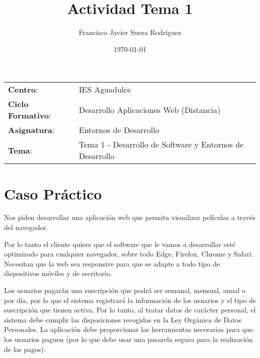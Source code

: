 


\title{
\normalfont \normalsize
\huge \textbf{Actividad Tema 1}
}
\author{Francisco Javier Sueza Rodríguez}
\date{\normalsize\today}



\maketitle

\vspace{2ex}

\begin{center}
    \begin{tabular}{l l}
        \textbf{Centro}: & IES Aguadulce \\
        \textbf{Ciclo Formativo}: & Desarrollo Aplicaciones Web (Distancia)\\
        \textbf{Asignatura}: & Entornos de Desarrollo\\
        \textbf{Tema}: & Tema 1 - Desarrollo de Software y Entornos de Desarrollo \\
    \end{tabular}
\end{center}

\vspace{10ex}

\section{Caso Práctico}
Nos piden desarrollar una aplicación web que permita visualizar películas a través del navegador.

Por lo tanto el cliente quiere que el software que le vamos a desarrollar esté optimizado para cualquier navegador, sobre todo Edge, Firefox, Chrome y Safari. Necesitan que la web sea responsive para que se adapte a todo tipo de dispositivos móviles y de escritorio.

Los usuarios pagarán una suscripción que podrá ser semanal, mensual, anual o por día, por lo que el sistema registrará la información de los usuarios y el tipo de suscripción que tienen activa. Por lo tanto, al tratar datos de carácter personal, el sistema debe cumplir las disposiciones recogidas en la Ley Orgánica de Datos Personales. La aplicación debe proporcionar las herramientas necesarias para que los usuarios paguen (por lo que debe usar una pasarela segura para la realización de los pagos).

